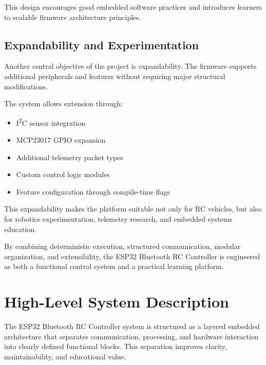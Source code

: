 This design encourages good embedded software practices and introduces learners to scalable firmware architecture principles.

\subsection{Expandability and Experimentation}

Another central objective of the project is expandability. The firmware supports additional peripherals and features without requiring major structural modifications.

The system allows extension through:

\begin{itemize}
	\item I\textsuperscript{2}C sensor integration
	\item MCP23017 GPIO expansion
	\item Additional telemetry packet types
	\item Custom control logic modules
	\item Feature configuration through compile-time flags
\end{itemize}

This expandability makes the platform suitable not only for RC vehicles, but also for robotics experimentation, telemetry research, and embedded systems education.

By combining deterministic execution, structured communication, modular organization, and extensibility, the ESP32 Bluetooth RC Controller is engineered as both a functional control system and a practical learning platform.





















\section{High-Level System Description}


The ESP32 Bluetooth RC Controller system is structured as a layered embedded architecture that separates communication, processing, and hardware interaction into clearly defined functional blocks. This separation improves clarity, maintainability, and educational value.

